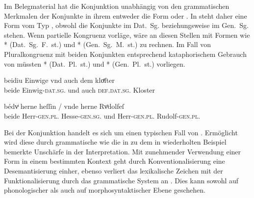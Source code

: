 Im Belegmaterial hat die Konjunktion unabhängig von den
grammatischen Merkmalen der Konjunkte in ihrem
 entweder die Form  oder . In
 steht daher eine Form vom Typ , obwohl die
Konjunkte im Dat.~Sg.  beziehungsweise im Gen.~Sg.
 stehen. Wenn partielle Kongruenz vorläge, wäre an diesen Stellen mit Formen wie
* (Dat.~Sg.~F.~st.) und * (Gen.~Sg.~M.~st.) zu
rechnen. Im Fall von Pluralkongruenz mit beiden Konjunkten entsprechend
kataphorischem Gebrauch von  müssten *
(Dat.~Pl.~st.) und * (Gen.~Pl.~st.) vorliegen.

\begin{exe}
\ex \label{ex:caoconjbeide}
	\begin{xlist}
	\ex \label{ex:caoconjbeide_1}
		\gll beidiu Einwige vnd auch dem kloͤſter \\
				beide Einwig-\textsc{dat.sg.\FemF} und auch
				\textsc{def.dat.sg.\NeutM} Kloster \\
		\trans {}
			\parencites(Nr.~2925, Landshut, 1298)[219,34]{cao4}

	\ex \label{ex:caoconjbeide_2}
		\gll bédvͥ herne heſſin / vnde herne Rvͦdolfeſ \\
			beide Herr-\textsc{gen.pl.\MascM} Hesse-\textsc{gen.sg.\MascM} {}
				und Herr-\textsc{gen.pl.\MascM} Rudolf-\textsc{gen.pl.\MascM}
				\\
		\trans {}
			\parencites(Nr.~1318, Freiburg i.\,Br., 1290)[561,11--12]{cao2}
	\end{xlist}
\end{exe}

Bei der Konjunktion  handelt es sich um einen typischen Fall von
 \autocite[vgl.][134--188]{lehmann2015}. Ermöglicht
wird diese durch grammatische  wie die in
 zu dem in  wiederholten
Beispiel bemerkte Unschärfe in der Interpretation. Mit
zunehmender Verwendung einer Form in einem bestimmten Kontext geht durch
Konventionalisierung eine Desemantisierung einher, ebenso
verliert das lexikalische Zeichen mit der Funktionalisierung durch das
grammatische System an . Dies kann sowohl auf phonologischer als
auch auf morphosyntaktischer Ebene geschehen.

